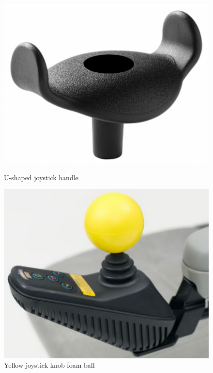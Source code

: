 \begin{figure}[!h]
\center
\begin{minipage}{0.45\linewidth}
\center
\captionsetup{justification=centering,margin=0cm,font=small}
\includegraphics[width=0.85\linewidth]{img/cap2/jck-ushape}
\caption{ U-shaped joystick handle \cite{jck-ushape2020}} \label{subfig:jck-ushape}
\end{minipage}
\begin{minipage}{0.45\linewidth}
\center
\captionsetup{justification=centering,margin=0cm,font=small}
\includegraphics[width=0.8\linewidth]{img/cap2/jck-ywlball}
\caption{ Yellow joystick knob foam ball \cite{jck-ywlball2020}} \label{subfig:jck-ywlball}
\end{minipage}
\end{figure}


